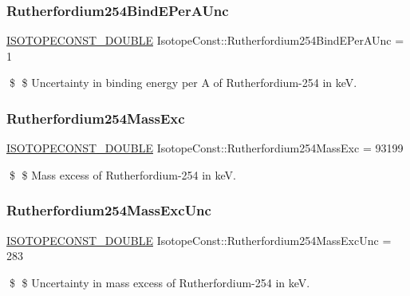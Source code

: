 \subsubsection{\texorpdfstring{Rutherfordium254\+Bind\+E\+Per\+A\+Unc}{Rutherfordium254BindEPerAUnc}}
{\footnotesize\ttfamily \mbox{\hyperlink{group___isotope_const-_macros_ga8f45a7272ce02c0b4c65c44636ed719a}{I\+S\+O\+T\+O\+P\+E\+C\+O\+N\+S\+T\+\_\+\+D\+O\+U\+B\+LE}} Isotope\+Const\+::\+Rutherfordium254\+Bind\+E\+Per\+A\+Unc = 1}

\$ \$ Uncertainty in binding energy per A of Rutherfordium-\/254 in keV. \mbox{\label{group___isotope_const-_rutherfordium-_rf254_ga43a5f95324a4b415f714881d01d7773e}} 
\subsubsection{\texorpdfstring{Rutherfordium254\+Mass\+Exc}{Rutherfordium254MassExc}}
{\footnotesize\ttfamily \mbox{\hyperlink{group___isotope_const-_macros_ga8f45a7272ce02c0b4c65c44636ed719a}{I\+S\+O\+T\+O\+P\+E\+C\+O\+N\+S\+T\+\_\+\+D\+O\+U\+B\+LE}} Isotope\+Const\+::\+Rutherfordium254\+Mass\+Exc = 93199}

\$ \$ Mass excess of Rutherfordium-\/254 in keV. \mbox{\label{group___isotope_const-_rutherfordium-_rf254_ga90cf335ae1edda3779eeebff55a6c34c}} 
\subsubsection{\texorpdfstring{Rutherfordium254\+Mass\+Exc\+Unc}{Rutherfordium254MassExcUnc}}
{\footnotesize\ttfamily \mbox{\hyperlink{group___isotope_const-_macros_ga8f45a7272ce02c0b4c65c44636ed719a}{I\+S\+O\+T\+O\+P\+E\+C\+O\+N\+S\+T\+\_\+\+D\+O\+U\+B\+LE}} Isotope\+Const\+::\+Rutherfordium254\+Mass\+Exc\+Unc = 283}

\$ \$ Uncertainty in mass excess of Rutherfordium-\/254 in keV. \mbox{\label{group___isotope_const-_rutherfordium-_rf254_ga594c74bd990d70c7b6344c22cf31ef4a}} 
